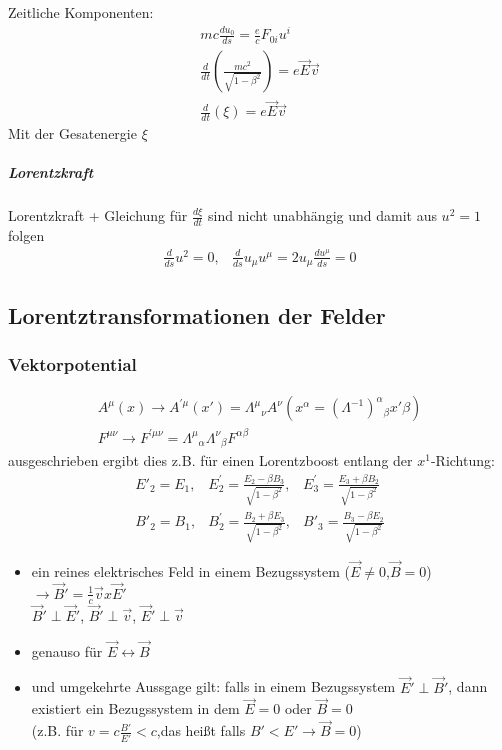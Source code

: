 \documentclass[a4paper]{article}
\begin{document}
Zeitliche Komponenten:
\begin{align}
mc\frac{du_0}{ds}=\frac{e}{c}F_{0i}u^i\\
\frac{d}{dt}\left(\frac{mc^2}{\sqrt{1-\beta^2}}\right)=e\vec{E}\vec{v}\\
\frac{d}{dt}\left( \xi \right)=e\vec{E}\vec{v}
\end{align}
Mit der Gesatenergie $\xi$
\subparagraph{Lorentzkraft}
Lorentzkraft + Gleichung für $\frac{d\xi}{dt}$ sind nicht unabhängig und damit 
aus $u^2=1$ folgen
\begin{align}
\frac{d}{ds}u^2=0, & \frac{d}{ds}u_\mu u^\mu=2u_\mu\frac{du^\mu}{ds}=0
\end{align}
\subsection{Lorentztransformationen der Felder}
\subsubsection{Vektorpotential}
\begin{align}
A^\mu(x)\rightarrow A^{'\mu}(x')=\Lambda^\mu{}_\nu
A^\nu(x^\alpha=(\Lambda^{-1})^\alpha{}_\beta x{'\beta})\\
F^{\mu\nu}\rightarrow
F^{'\mu\nu}=\Lambda^\mu{}_\alpha \Lambda^\nu{}_\beta F^{\alpha\beta}
\end{align}
ausgeschrieben ergibt dies z.B. für einen Lorentzboost entlang der
$x^1$-Richtung:
\begin{align}
E'_2=E_1 , & E^{'}_2=\frac{E_2-\beta B_3}{\sqrt{1-\beta^2}} , &
E^{'}_3=\frac{E_3+\beta B_2}{\sqrt{1-\beta^2}}\\
B'_2=B_1 , & B^{'}_2=\frac{B_2+\beta E_3}{\sqrt{1-\beta^2}} , &
B'_3=\frac{B_3-\beta E_2}{\sqrt{1-\beta^2}}
\end{align}
\begin{itemize}
  \item ein reines elektrisches Feld in einem Bezugssystem
  ($\vec{E}\neq0$,$\vec{B}=0$)\\ $\rightarrow
  \vec{B}'=\frac{1}{c}\vec{v}x\vec{E}'$ \\ $\vec{B}'\perp \vec{E}'$,
  $\vec{B}'\perp \vec{v}$, $\vec{E}'\perp \vec{v}$
  \item genauso für $\vec{E}\leftrightarrow\vec{B}$
  \item und umgekehrte Aussgage gilt: falls in einem Bezugssystem
  $\vec{E}'\perp\vec{B}'$, dann existiert ein Bezugssystem in dem $\vec{E}=0$
  oder $\vec{B}=0$\\ (z.B. für $v=c\frac{B'}{E'}<c$,das heißt falls
  $B'<E'\rightarrow\vec{B}=0$)
\end{itemize}
\end{document}
